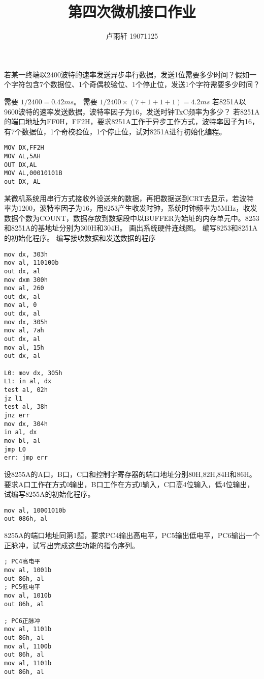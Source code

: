 \documentclass{ctexart}
\title{第四次微机接口作业}
\author{卢雨轩 19071125}
\begin{document}
\maketitle

\begin{outline}[enumerate]
    \1 若某一终端以2400波特的速率发送异步串行数据，发送1位需要多少时间？假如一个字符包含7个数据位、1个奇偶校验位、1个停止位，发送1个字符需要多少时间？

        \2 需要 $1 / 2400 = 0.42 ms$。
        \2 需要 $1 / 2400 \times (7 + 1 + 1 + 1) = 4.2ms$
    \1 若8251A以9600波特的速率发送数据，波特率因子为16，发送时钟TxC频率为多少？
    \1 若8251A的端口地址为FF0H，FF2H，要求8251A工作于异步工作方式，波特率因子为16，有7个数据位，1个奇校验位，1个停止位，试对8251A进行初始化编程。
\begin{verbatim}
MOV DX,FF2H
MOV AL,5AH
OUT DX,AL
MOV AL,00010101B
out DX, AL
\end{verbatim}

\1 某微机系统用串行方式接收外设送来的数据，再把数据送到CRT去显示，若波特率为1200，波特率因子为16，用8253产生收发时钟，系统时钟频率为5MHz，收发数据个数为COUNT，数据存放到数据段中以BUFFER为始址的内存单元中。8253和8251A的基地址分别为300H和304H。
\2 画出系统硬件连线图。
\2 编写8253和8251A的初始化程序。
\2 编写接收数据和发送数据的程序
\begin{verbatim}
mov dx, 303h
mov al, 110100b
out dx, al
mov dxm 300h
mov al, 260
out dx, al
mov al, 0
out dx, al
mov dx, 305h
mov al, 7ah
out dx, al
mov al, 15h 
out dx, al

L0: mov dx, 305h
L1: in al, dx
test al, 02h
jz l1
test al, 38h
jnz err
mov dx, 304h
in al, dx
mov bl, al
jmp L0
err: jmp err
\end{verbatim}
\1 设8255A的A口，B口，C口和控制字寄存器的端口地址分别80H,82H,84H和86H。要求A口工作在方式0输出，B口工作在方式0输入，C口高4位输入，低4位输出，试编写8255A的初始化程序。
\begin{verbatim}
mov al, 10001010b
out 086h, al
\end{verbatim}
\1 8255A的端口地址同第1题，要求PC4输出高电平，PC5输出低电平，PC6输出一个正脉冲，试写出完成这些功能的指令序列。
\begin{verbatim}
; PC4高电平
mov al, 1001b
out 86h, al
; PC5低电平
mov al, 1010b
out 86h, al

; PC6正脉冲
mov al, 1101b
out 86h, al
mov al, 1100b
out 86h, al
mov al, 1101b
out 86h, al
\end{verbatim}

\end{outline}
\end{document}
